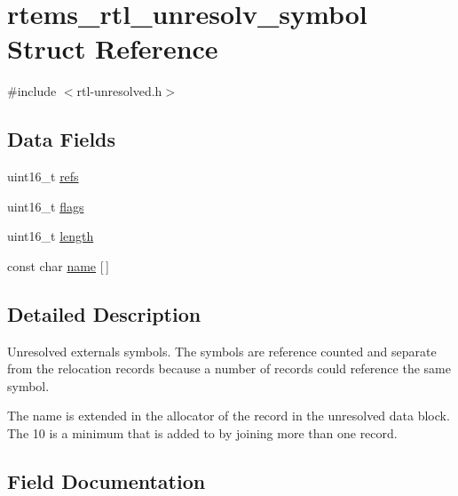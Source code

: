 \hypertarget{structrtems__rtl__unresolv__symbol}{}\section{rtems\+\_\+rtl\+\_\+unresolv\+\_\+symbol Struct Reference}
\label{structrtems__rtl__unresolv__symbol}


{\ttfamily \#include $<$rtl-\/unresolved.\+h$>$}

\subsection*{Data Fields}
\begin{DoxyCompactItemize}
\item 
uint16\+\_\+t \mbox{\hyperlink{structrtems__rtl__unresolv__symbol_a5704e7d1e1bd5dbd0d073231616aabdc}{refs}}
\item 
uint16\+\_\+t \mbox{\hyperlink{structrtems__rtl__unresolv__symbol_a06aec32d5aac8917b59f1878f7a4cf58}{flags}}
\item 
uint16\+\_\+t \mbox{\hyperlink{structrtems__rtl__unresolv__symbol_a3a64b5936bd762948779a30e3048f757}{length}}
\item 
const char \mbox{\hyperlink{structrtems__rtl__unresolv__symbol_adf138f38ded443fdda7989c3f3494714}{name}} \mbox{[}$\,$\mbox{]}
\end{DoxyCompactItemize}


\subsection{Detailed Description}
Unresolved externals symbols. The symbols are reference counted and separate from the relocation records because a number of records could reference the same symbol.

The name is extended in the allocator of the record in the unresolved data block. The 10 is a minimum that is added to by joining more than one record. 

\subsection{Field Documentation}
\mbox{\label{structrtems__rtl__unresolv__symbol_a06aec32d5aac8917b59f1878f7a4cf58}} 

